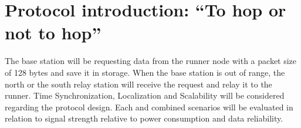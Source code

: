 \section{Protocol introduction: “To hop or not to hop”}\label{sc:protocolIntroduction}
The base station will be requesting data from the runner node with a packet size of 128 bytes and save it in storage. When the base station is out of range, the north or the south relay station will receive the request and relay it to the runner. Time Synchronization, Localization and Scalability will be considered regarding the protocol design. Each and combined scenarios will be evaluated in relation to signal strength relative to power consumption and data reliability.

